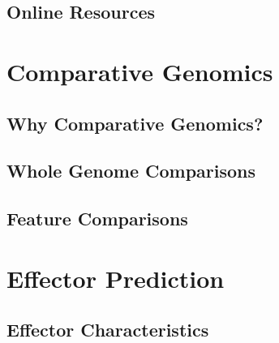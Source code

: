 \subsection{Online Resources}



\section{Comparative Genomics}

\subsection{Why Comparative Genomics?}


\subsection{Whole Genome Comparisons}


\subsection{Feature Comparisons}



\section{Effector Prediction}

\subsection{Effector Characteristics}





